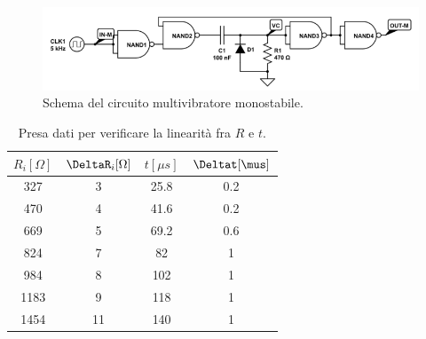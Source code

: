 \documentclass[10pt,a4paper]{article}
\begin{document}




\begin{figure}[!htb]
  \centering
  \includegraphics[scale=0.5]{monostabile.png}
\caption{Schema del circuito multivibratore monostabile.\label{fig:monostabile}}
\end{figure}

\begin{table}[!htb]
\centering
\begin{tabular}{|c|c|c|c|}
\hline 
$R_i [\Omega]$ & $\DeltaR_i [\Omega]$ & $t [\mu s]$ & $\Deltat [\mus]$\\
\hline
 327 &  3 & 25.8 & 0.2\\ 
\hline 
 470 &  4 & 41.6 & 0.2\\ 
\hline
 669 &  5 & 69.2 & 0.6\\ 
\hline
 824 &  7 & 82 & 1\\ 
\hline 
 984 &  8 & 102 & 1\\ 
\hline
 1183 &  9 & 118 & 1\\ 
\hline
 1454 &  11 & 140 & 1\\ 
\hline
\end{tabular} 
\caption{Presa dati per verificare la linearità fra $R$ e $t$.\label{tab:monostabile}}
\end{table}

\end{document}
